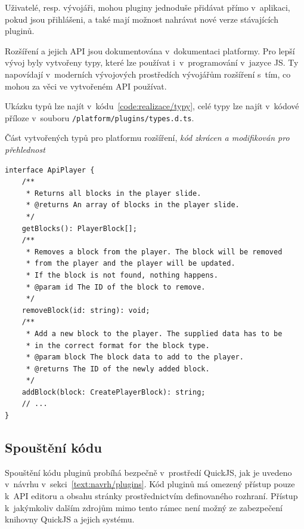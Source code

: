 Uživatelé, resp. vývojáři, mohou pluginy jednoduše přidávat přímo v~aplikaci, pokud jsou přihlášeni, a také mají možnost nahrávat nové verze stávajících pluginů. 

Rozšíření a jejich API jsou dokumentována v~dokumentaci platformy.
Pro lepší vývoj byly vytvořeny typy, které lze používat i~v~programování v~jazyce JS.
Ty napovídají v~moderních vývojových prostředích vývojářům rozšíření s~tím, co mohou za věci ve vytvořeném API používat.

Ukázku typů lze najít v~kódu~\ref{code:realizace/typy}, celé typy lze najít v~kódové příloze v~souboru \verb|/platform/plugins/types.d.ts|.


\begin{listing}[ht!]
\caption[Část vytvořených typů pro platformu rozšíření]{Část vytvořených typů pro platformu rozšíření, \textit{kód zkrácen a modifikován pro přehlednost}}\label{code:realizace/typy}
\begin{verbatim}
interface ApiPlayer {
    /**
     * Returns all blocks in the player slide.
     * @returns An array of blocks in the player slide.
     */
    getBlocks(): PlayerBlock[];
    /**
     * Removes a block from the player. The block will be removed 
     * from the player and the player will be updated.
     * If the block is not found, nothing happens.
     * @param id The ID of the block to remove.
     */
    removeBlock(id: string): void;
    /**
     * Add a new block to the player. The supplied data has to be
     * in the correct format for the block type.
     * @param block The block data to add to the player.
     * @returns The ID of the newly added block.
     */
    addBlock(block: CreatePlayerBlock): string;
    // ...
}
\end{verbatim}
\end{listing}

\subsection{Spouštění kódu}

Spouštění kódu pluginů probíhá bezpečně v~prostředí QuickJS, jak je uvedeno v~návrhu v~sekci~\ref{text:navrh/plugins}. 
Kód pluginů má omezený přístup pouze k~API editoru a obsahu stránky prostřednictvím definovaného rozhraní. 
Přístup k~jakýmkoliv dalším zdrojům mimo tento rámec není možný ze zabezpečení knihovny QuickJS a jejich systému.

